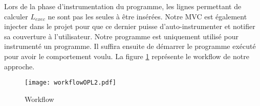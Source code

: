Lors de la phase d'instrumentation du programme, les lignes permettant de calculer $L_{exec}$ ne sont pas les seules à être insérées. Notre MVC est également injecter dans le projet pour que ce dernier puisse d'auto-instrumenter et notifier sa couverture à l'utilisateur. Notre programme est uniquement utilisé pour instrumenté un programme. Il suffira ensuite de démarrer le programme exécuté pour avoir le comportement voulu. La figure \ref{workflow} représente le workflow de notre approche. 

\begin{figure}[h]
\centering
\texttt{[image: workflowOPL2.pdf]}

\caption{Workflow}
\label{workflow}
\end{figure}


